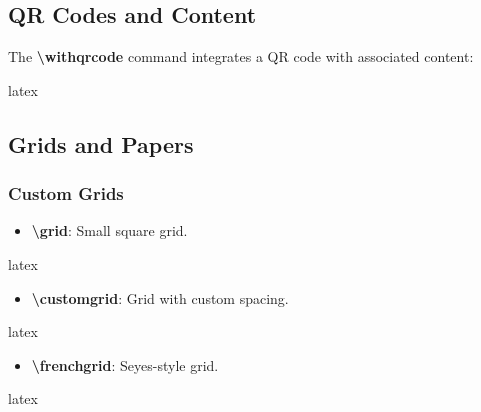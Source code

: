 \documentclass[
    margin=2cm
]{neoschool}
\begin{document}
\subsection{QR Codes and Content}

The \textbf{\textbackslash withqrcode} command integrates a QR code with associated
content:

\begin{code}{latex}


\end{code}

\subsection{Grids and Papers}

\subsubsection{Custom Grids}

\begin{itemize}
\item
  \textbf{\textbackslash grid}: Small square grid.
\end{itemize}

\begin{code}{latex}
\grid[blue]{10cm}{5cm}  %
\end{code}

\begin{itemize}
\item
  \textbf{\textbackslash customgrid}: Grid with custom spacing.
\end{itemize}

\begin{code}{latex}
\customgrid[red][4mm][4mm]{12cm}{8cm}  %
\end{code}

\begin{itemize}
\item
  \textbf{\textbackslash frenchgrid}: Seyes-style grid.
\end{itemize}

\begin{code}{latex}
\frenchgrid{15cm}{10cm}  %
\end{code}
\end{document}
